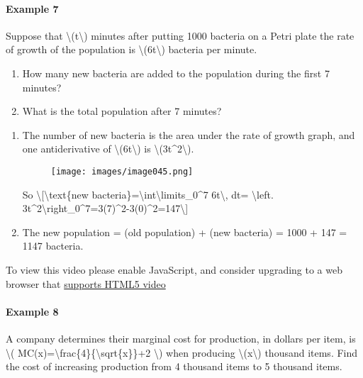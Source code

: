 \hypertarget{example-7}{%
\paragraph{Example 7}\label{example-7}}

Suppose that \textbackslash{}(t\textbackslash{}) minutes after putting
1000 bacteria on a Petri plate the rate of growth of the population is
\textbackslash{}(6t\textbackslash{}) bacteria per minute.

\begin{enumerate}
\tightlist
\item
  How many new bacteria are added to the population during the first 7
  minutes?
\item
  What is the total population after 7 minutes?
\end{enumerate}

\begin{enumerate}
\item
  The number of new bacteria is the area under the rate of growth graph,
  and one antiderivative of \textbackslash{}(6t\textbackslash{}) is
  \textbackslash{}(3t\^{}2\textbackslash{}).

  \begin{figure}
  \centering
  \texttt{[image: images/image045.png]}
  \caption{}
  \end{figure}

  So \textbackslash{}{[}\textbackslash{}text\{new
  bacteria\}=\textbackslash{}int\textbackslash{}limits\_0\^{}7
  6t\textbackslash{}, dt= \textbackslash{}left.
  3t\^{}2\textbackslash{}right\textbar{}\_0\^{}7=3(7)\^{}2-3(0)\^{}2=147\textbackslash{}{]}
\item
  The new population = (old population) + (new bacteria) = 1000 + 147 =
  1147 bacteria.
\end{enumerate}

To view this video please enable JavaScript, and consider upgrading to a
web browser that \href{http://videojs.com/html5-video-support/}{supports
HTML5 video}

\hypertarget{example-8}{%
\paragraph{Example 8}\label{example-8}}

A company determines their marginal cost for production, in dollars per
item, is \textbackslash{}(
MC(x)=\textbackslash{}frac\{4\}\{\textbackslash{}sqrt\{x\}\}+2
\textbackslash{}) when producing \textbackslash{}(x\textbackslash{})
thousand items. Find the cost of increasing production from 4 thousand
items to 5 thousand items.

